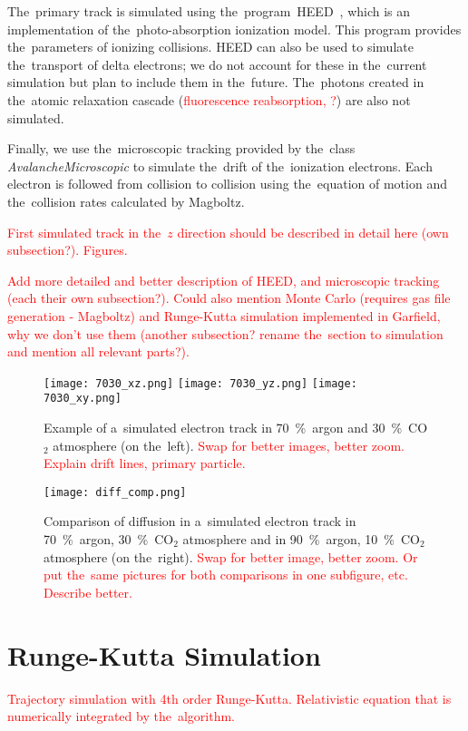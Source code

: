 		The~primary track is simulated using the~program~\ac{HEED}~\cite{HEED}, which is an implementation of the~photo-absorption ionization model. This program provides the~parameters of ionizing collisions. \ac{HEED} can also be used to simulate the~transport of delta electrons; we do not account for these in the~current simulation but plan to include them in the~future. The~photons created in the~atomic relaxation cascade (\textcolor{red}{fluorescence reabsorption, ?}) are also not simulated.
		
		Finally, we use the~microscopic tracking provided by the~class \textit{AvalancheMicroscopic} to simulate the~drift of the~ionization electrons. Each electron is followed from collision to collision using the~equation of motion and the~collision rates calculated by Magboltz.
		
		\textcolor{red}{First simulated track in the~$z$ direction should be described in detail here (own subsection?). Figures.}
		
		\textcolor{red}{Add more detailed and better description of HEED, and microscopic tracking (each their own subsection?). Could also mention Monte Carlo (requires gas file generation - Magboltz) and Runge-Kutta simulation implemented in Garfield, why we don't use them (another subsection? rename the~section to \garfieldpp simulation and mention all relevant parts?).}
		
		\begin{figure}[H]
			\centering
			\texttt{[image: 7030\_xz.png]}
			\texttt{[image: 7030\_yz.png]}
			\texttt{[image: 7030\_xy.png]}
			\caption{Example of a~simulated electron track in 70~\%~argon and 30~\%~CO$_2$ atmosphere (on the~left). \textcolor{red}{Swap for better images, better zoom. Explain drift lines, primary particle.}}
			\label{fig:7030sim}
		\end{figure}
		
		\begin{figure}[H]
			\centering
			\texttt{[image: diff\_comp.png]}
			\caption{Comparison of diffusion in a~simulated electron track in 70~\%~argon, 30~\%~CO$_2$ atmosphere and in 90~\%~argon, 10~\%~CO$_2$ atmosphere (on the~right). \textcolor{red}{Swap for better image, better zoom. Or put the~same pictures for both comparisons in one subfigure, etc. Describe better.}}
			\label{fig:diffcomp}
		\end{figure}
	
	\section{Runge-Kutta Simulation}
	\label{sec:rks}
		\textcolor{red}{Trajectory simulation with 4th order Runge-Kutta. Relativistic equation that is numerically integrated by the~algorithm.}	